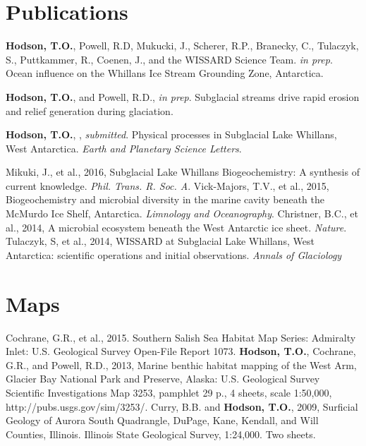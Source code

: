 \section{Publications}
\begin{thebibliography}{1}
\bibitem{}\textbf{Hodson, T.O.}, Powell, R.D, Mukucki, J., Scherer, R.P., Branecky, C., Tulaczyk, S., Puttkammer, R., Coenen, J., and the WISSARD Science Team. 
\textsl{in prep}. Ocean influence on the Whillans Ice Stream Grounding Zone, Antarctica. 

\bibitem{}\textbf{Hodson, T.O.}, and Powell, R.D., \textsl{in prep}. Subglacial streams drive rapid erosion and relief generation during glaciation.

\bibitem{}\textbf{Hodson, T.O.}, , \textsl{submitted}. Physical processes in Subglacial Lake Whillans, West Antarctica.
\textsl{Earth and Planetary Science Letters}.

\bibitem{}Mikuki, J., et al., 2016, Subglacial Lake Whillans Biogeochemistry: A synthesis of current knowledge. \textsl{Phil. Trans. R. Soc. A}.
\bibitem{}Vick-Majors, T.V., et al., 2015, Biogeochemistry and microbial diversity in the marine cavity beneath the McMurdo Ice Shelf, Antarctica.
\textsl{Limnology and Oceanography}.
\bibitem{}Christner, B.C., et al., 2014, A microbial ecosystem beneath the West Antarctic ice sheet. \textsl{Nature}.
\bibitem{}Tulaczyk, S, et al., 2014, WISSARD at Subglacial Lake Whillans, West Antarctica: scientific operations and initial observations. \textsl{Annals of Glaciology}
\end{thebibliography}
\section{Maps}
\begin{thebibliography}{2}
\bibitem{}Cochrane, G.R., et al., 2015. Southern Salish Sea Habitat Map Series: Admiralty Inlet: U.S. Geological Survey Open-File Report 1073.
\bibitem{}\textbf{Hodson, T.O.}, Cochrane, G.R., and Powell, R.D., 2013, Marine benthic habitat mapping of the West Arm, Glacier Bay National Park and Preserve, Alaska: U.S. Geological Survey Scientific Investigations Map 3253, pamphlet 29 p., 4 sheets, scale 1:50,000, http://pubs.usgs.gov/sim/3253/.
\bibitem{}Curry, B.B. and \textbf{Hodson, T.O.}, 2009, Surficial Geology of Aurora South Quadrangle, DuPage, Kane, Kendall, and Will Counties, Illinois. Illinois State Geological Survey, 1:24,000. Two sheets.
\end{thebibliography}

